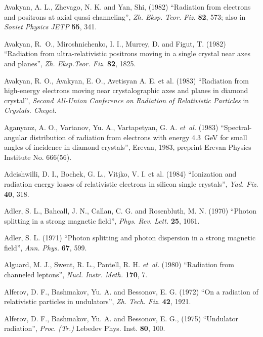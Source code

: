 
\begin{thebibliography}{}

Avakyan, A. L., Zhevago, N. K. and Yan, Shi, (1982)
``Radiation from electrons and positrons at axial quasi
channeling'', {\it Zh. Eksp. Teor. Fiz.} {\bf 82}, 573; also in
{\it Soviet Physics JETP} {\bf 55}, 341.

Avakyan, R.~O., Miroshnichenko, I. I., Murrey, D.
and Figut, T. (1982) ``Radiation from ultra-relativistic
positrons moving in a single crystal near axes and planes'',
{\it Zh. Eksp.Teor. Fiz.} {\bf 82}, 1825.  

Avakyan, R. O., Avakyan, E. O., Avetisyan A. E. et
al. (1983) ``Radiation from high-energy electrons moving near
crystalographic axes and planes in diamond crystal'', {\it
Second All-Union Conference on Radiation of Relativistic
Particles} in {\it Crystals. Cheget.}  

Aganyanz, A. O., Vartanov, Yu. A., Vartapetyan, G.
A. {\it et~al.}  (1983) ``Spectral-angular distribution of radiation
from electrons with energy 4.3~GeV for small angles of incidence
in diamond crystals'', Erevan, 1983, preprint Erevan Physics 
Institute No. 666(56).    

Adeishwilli, D. I., Bochek, G. L., Vitjko, V. I. et
al. (1984) ``Ionization and radiation energy losses of
relativistic electrons in silicon single crystals'', {\it Yad.
Fiz.} {\bf 40}, 318.

Adler, S. L., Bahcall, J. N., Callan, C. G. and
Rosenbluth, M. N. (1970) ``Photon splitting in a strong magnetic
field'', {\it Phys. Rev. Lett.} {\bf 25}, 1061.

Adler, S. L. (1971) ``Photon splitting and photon
dispersion in a strong magnetic field'', {\it Ann. Phys.} {\bf
67}, 599. 

Alguard, M. J., Swent, R. L., Pantell, R. H. {\it et~al.} 
(1980) ``Radiation from channeled leptons'', {\it Nucl. Instr.
Meth.} {\bf 170}, 7.

Alferov, D. F., Bashmakov, Yu. A. and Bessonov, E.
G. (1972) ``On a radiation of relativistic particles in
undulators'', {\it Zh. Tech. Fiz.} {\bf 42}, 1921.

Alferov, D. F., Bashmakov, Yu. A. and Bessonov, E.
G., (1975) ``Undulator radiation'', {\it Proc. (Tr.)} Lebedev
Phys. Inst. {\bf 80}, 100. 


\end{thebibliography}
